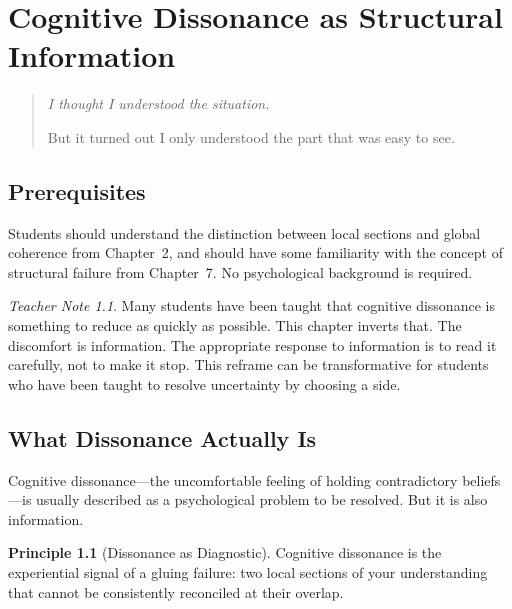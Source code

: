 \documentclass[11pt]{book}
\theoremstyle{definition}
\newtheorem{principle}[definition]{Principle}
\theoremstyle{remark}
\newtheorem{teachernote}{Teacher Note}[chapter]
\newenvironment{deepthought}
  {\begin{quote}\itshape}
  {\end{quote}}
\begin{document}
\chapter{Cognitive Dissonance as Structural Information}

\begin{deepthought}
I thought I understood the situation.

But it turned out I only understood the part that was easy to see.
\end{deepthought}

\section*{Prerequisites}

Students should understand the distinction between local sections and
global coherence from Chapter~2, and should have some familiarity
with the concept of structural failure from Chapter~7. No psychological
background is required.

\begin{teachernote}
Many students have been taught that cognitive dissonance is something
to reduce as quickly as possible. This chapter inverts that. The
discomfort is information. The appropriate response to information is
to read it carefully, not to make it stop. This reframe can be
transformative for students who have been taught to resolve uncertainty
by choosing a side.
\end{teachernote}

\section{What Dissonance Actually Is}

Cognitive dissonance---the uncomfortable feeling of holding contradictory
beliefs---is usually described as a psychological problem to be resolved.
But it is also information.

\begin{principle}[Dissonance as Diagnostic]
Cognitive dissonance is the experiential signal of a gluing failure: two
local sections of your understanding that cannot be consistently reconciled
at their overlap.
\end{principle}
\end{document}
